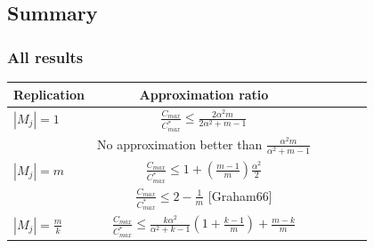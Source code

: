 \documentclass[usenames,dvipsnames]{beamer}
\begin{document}
\subsection{Summary}

\begin{frame}
  \frametitle{All results}
  
  \begin{center}

    \begin{tabular}{|l|c|c|c|c|c|}
      \hline
      Replication & Approximation ratio  \\
      \hline
      $|M_j|=1$ & $\frac{C_{max}}{C_{max}^{*}}\leq \frac{2\alpha^{2}m}{2\alpha^{2}+ m-1}$ \\
      & No approximation better than $\frac{\alpha^{2}m }{\alpha^{2} + m-1}$  \\
      
      \hline
      $|M_j|=m$ & $\frac{C_{max}}{C_{max}^{*}} \leq 1 + (\frac{m-1}{m})\frac{\alpha^{2}}{2}$  \\
      & $\frac{C_{max}}{C_{max}^{*}} \leq 2-\frac{1}{m}$ [Graham66]   \\
      \hline
      
      $|M_j|= \frac{m}{k} $ & $\frac{C_{max}}{C_{max}^{*}} \leq \frac{k\alpha^{2}}{\alpha^{2}+k-1} \left(1+ {\frac{k-1}{m}} \right)+ {\frac{m-k}{m}}$ \\
      
      \hline
    \end{tabular}
  \end{center}
\end{frame}
\end{document}
